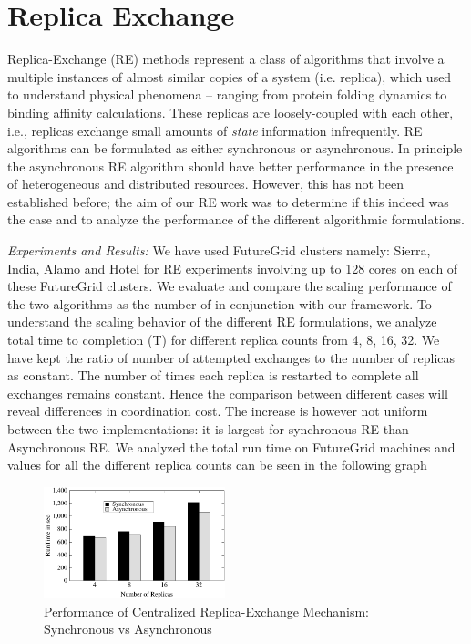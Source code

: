 \documentclass[]{paper}
\begin{document}
\section{Replica Exchange}

Replica-Exchange (RE) methods represent a class of algorithms that involve a multiple instances of almost similar copies of a system (i.e. replica), which used to understand physical phenomena – ranging from protein folding dynamics to binding affinity calculations. These replicas are loosely-coupled with each other, i.e., replicas exchange small amounts of {\it state} information infrequently.  RE algorithms can be formulated as either synchronous or asynchronous.  In principle the asynchronous RE algorithm should have better performance in the presence of heterogeneous and distributed resources.  However, this has not been established before; the aim of our RE work was to determine if this indeed was the case and to analyze the performance of the different algorithmic formulations.


{\it Experiments and Results:} We have used FutureGrid clusters namely: Sierra, India, Alamo and Hotel for RE experiments involving up to 128 cores on each of these FutureGrid clusters. We evaluate and compare the scaling
performance of the two algorithms as the number of in conjunction with our framework. To understand the scaling behavior of the different RE formulations, we analyze total time to completion (T) for different replica counts from 4, 8, 16, 32. We have kept the ratio of number of attempted exchanges to the number of replicas as constant. The number of times each replica is restarted to complete all exchanges remains constant. Hence the comparison between different cases will reveal differences in coordination cost. The increase is however not uniform between the two implementations: it is largest for synchronous RE than Asynchronous RE. We analyzed the total run time on FutureGrid machines and values for all the different replica counts can be seen in the following graph \begin{figure}[t]
  \centering \includegraphics[width=0.47\textwidth]{figures/FG_RE.pdf} \caption{Performance of Centralized Replica-Exchange Mechanism: Synchronous vs Asynchronous}
\label{figure(i)}
\end{figure}		
\end{document}
